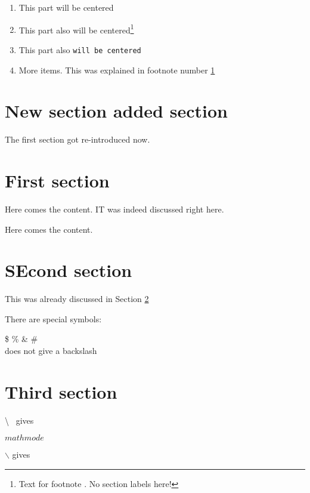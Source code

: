 \documentclass[12pt,a4paper]{report}
\begin{document}
\begin{enumerate}
\item This part will be centered

\item This part also will be centered\footnote{Text for footnote
\label{footnote-my-name}. No section labels here! }

\item This part also \texttt{will be centered}
\item More items. This was explained in footnote number 
\ref{footnote-my-name} 
\end{enumerate}













\section{New section added section}

The first section got re-introduced now.

\section{First section} \label{our:name:section1}

Here comes the content.
IT was indeed discussed right here.

Here comes the content.

\section*{SEcond section}

This was already discussed in Section \ref{our:name:section1}

There are special symbols:

\$ \% \& \# \\ does not give a backslash

\section{Third section}

\textbackslash ~ gives

$ math mode$ 



$\backslash$ gives
\end{document}
